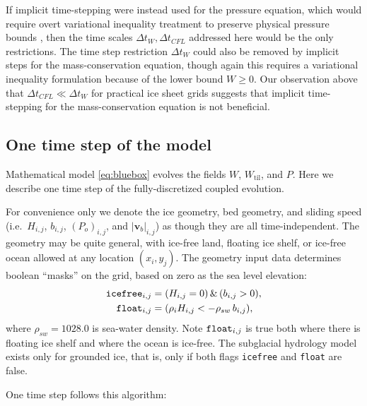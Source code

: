 \documentclass[gmd]{copernicus}   %
\begin{document}
If implicit time-stepping were instead used for the pressure equation, which would require overt variational inequality treatment to preserve physical pressure bounds \citep{Schoofetal2012}, then the time scales $\Delta t_W, \Delta t_{CFL}$ addressed here would be the only restrictions.  The time step restriction $\Delta t_W$ could also be removed by implicit steps for the mass-conservation equation, though again this requires a variational inequality formulation because of the lower bound $W\ge 0$.  Our observation above that $\Delta t_{CFL} \ll \Delta t_W$ for practical ice sheet grids suggests that implicit time-stepping for the mass-conservation equation is not beneficial.

\subsection{One time step of the model}  \label{subsec:onestep}  Mathematical model \eqref{eq:bluebox} evolves the fields $W$, $W_{\text{til}}$, and $P$.  Here we describe one time step of the fully-discretized coupled evolution.

For convenience only we denote the ice geometry, bed geometry, and sliding speed (i.e.~$H_{i,j}$, $b_{i,j}$, $(P_o)_{i,j}$, and $|\mathbf{v}_b|_{i,j}$) as though they are all time-independent.  The geometry may be quite general, with ice-free land, floating ice shelf, or ice-free ocean allowed at any location $(x_i,y_j)$.  The geometry input data determines boolean ``masks'' on the grid, based on zero as the sea level elevation:
\begin{align*}
\text{\texttt{icefree}}_{i,j} &= (H_{i,j} = 0)\, \&\, (b_{i,j} > 0), \\
\text{\texttt{float}}_{i,j}   &= (\rho_i H_{i,j} < - \rho_{sw}\, b_{i,j}),
\end{align*}
where $\rho_{sw}=1028.0$ is sea-water density.  Note $\text{\texttt{float}}_{i,j}$ is true both where there is floating ice shelf and where the ocean is ice-free.  The subglacial hydrology model exists only for grounded ice, that is, only if both flags \texttt{icefree} and \texttt{float} are false.

One time step follows this algorithm:
\end{document}

